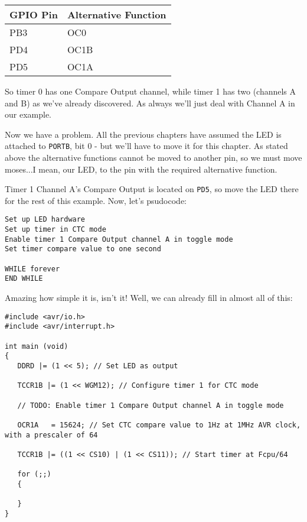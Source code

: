 \documentclass[a4paper,oneside,notitlepage]{book}
\begin{document}
\begin{center}
\begin{tabular}{|l|l|}
	\hline
	GPIO Pin & Alternative Function \\
	\hline
	PB3 & OC0  \\
	PD4 & OC1B \\
	PD5 & OC1A \\ 
	\hline
\end{tabular}
\end{center}

So timer 0 has one Compare Output channel, while timer 1 has two (channels A and B) as we've already discovered. As always we'll just deal with Channel A in our example.

Now we have a problem. All the previous chapters have assumed the LED is attached to \texttt{PORTB}, bit 0 - but we'll have to move it for this chapter. As stated above the alternative functions cannot be moved to another pin, so we must move moses...I mean, our LED, to the pin with the required alternative function.

Timer 1 Channel A's Compare Output is located on \texttt{PD5}, so move the LED there for the rest of this example. Now, let's psudocode:

\begin{center}
\begin{lstlisting}[keywordstyle=\color{black},commentstyle=\color{black}]
Set up LED hardware
Set up timer in CTC mode
Enable timer 1 Compare Output channel A in toggle mode
Set timer compare value to one second

WHILE forever
END WHILE 
\end{lstlisting}
\end{center}

Amazing how simple it is, isn't it! Well, we can already fill in almost all of this: 

\begin{center}
\begin{lstlisting}
#include <avr/io.h>
#include <avr/interrupt.h>

int main (void)
{
   DDRD |= (1 << 5); // Set LED as output

   TCCR1B |= (1 << WGM12); // Configure timer 1 for CTC mode

   // TODO: Enable timer 1 Compare Output channel A in toggle mode

   OCR1A   = 15624; // Set CTC compare value to 1Hz at 1MHz AVR clock, with a prescaler of 64

   TCCR1B |= ((1 << CS10) | (1 << CS11)); // Start timer at Fcpu/64

   for (;;)
   {

   }
}
\end{lstlisting}
\end{center}
\end{document}
